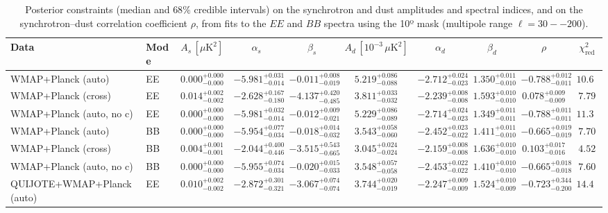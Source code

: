 \begin{table}[t]
\centering
\scriptsize
\setlength{\tabcolsep}{4pt}
\caption{Posterior constraints (median and $68\%$ credible intervals) on the synchrotron and dust amplitudes and spectral indices, and on the synchrotron--dust correlation coefficient $\rho$, from fits to the $EE$ and $BB$ spectra using the 10º mask (multipole range $\ell=30--200$).}
\label{tab:fit_results}
\begin{tabular}{llcccccccc}
\toprule
Data & Mode & $A_s\,[\mu\mathrm{K}^2]$ & $\alpha_s$ & $\beta_s$ & $A_d\,[10^{-3}\,\mu\mathrm{K}^2]$ & $\alpha_d$ & $\beta_d$ & $\rho$ & $\chi^2_\mathrm{red}$ \\
\midrule
WMAP+Planck (auto) & EE & $0.000^{+0.000}_{-0.000}$ & $-5.981^{+0.031}_{-0.014}$ & $-0.011^{+0.008}_{-0.019}$ & $5.219^{+0.086}_{-0.088}$ & $-2.712^{+0.024}_{-0.023}$ & $1.350^{+0.011}_{-0.010}$ & $-0.788^{+0.012}_{-0.011}$ & $10.69$ \\
WMAP+Planck (cross) & EE & $0.014^{+0.002}_{-0.002}$ & $-2.628^{+0.167}_{-0.180}$ & $-4.137^{+0.420}_{-0.485}$ & $3.811^{+0.033}_{-0.032}$ & $-2.239^{+0.008}_{-0.008}$ & $1.593^{+0.010}_{-0.010}$ & $0.078^{+0.009}_{-0.009}$ & $7.79$ \\
WMAP+Planck (auto, no c) & EE & $0.000^{+0.000}_{-0.000}$ & $-5.981^{+0.032}_{-0.014}$ & $-0.012^{+0.009}_{-0.021}$ & $5.229^{+0.086}_{-0.089}$ & $-2.714^{+0.024}_{-0.023}$ & $1.349^{+0.011}_{-0.011}$ & $-0.788^{+0.011}_{-0.011}$ & $11.30$ \\
WMAP+Planck (auto) & BB & $0.000^{+0.000}_{-0.000}$ & $-5.954^{+0.077}_{-0.034}$ & $-0.018^{+0.014}_{-0.032}$ & $3.543^{+0.058}_{-0.060}$ & $-2.452^{+0.023}_{-0.022}$ & $1.411^{+0.011}_{-0.010}$ & $-0.665^{+0.019}_{-0.019}$ & $7.70$ \\
WMAP+Planck (cross) & BB & $0.004^{+0.001}_{-0.001}$ & $-2.044^{+0.400}_{-0.446}$ & $-3.515^{+0.543}_{-0.665}$ & $3.045^{+0.024}_{-0.024}$ & $-2.159^{+0.008}_{-0.008}$ & $1.636^{+0.010}_{-0.010}$ & $0.103^{+0.017}_{-0.016}$ & $4.52$ \\
WMAP+Planck (auto, no c) & BB & $0.000^{+0.000}_{-0.000}$ & $-5.955^{+0.074}_{-0.034}$ & $-0.020^{+0.015}_{-0.033}$ & $3.548^{+0.057}_{-0.058}$ & $-2.453^{+0.022}_{-0.022}$ & $1.410^{+0.010}_{-0.010}$ & $-0.665^{+0.018}_{-0.018}$ & $7.60$ \\
QUIJOTE+WMAP+Planck (auto) & EE & $0.010^{+0.002}_{-0.002}$ & $-2.872^{+0.301}_{-0.321}$ & $-3.067^{+0.074}_{-0.074}$ & $3.744^{+0.020}_{-0.019}$ & $-2.247^{+0.009}_{-0.009}$ & $1.524^{+0.010}_{-0.009}$ & $-0.723^{+0.344}_{-0.200}$ & $14.46$ \\

\end{tabular}
\end{table}
